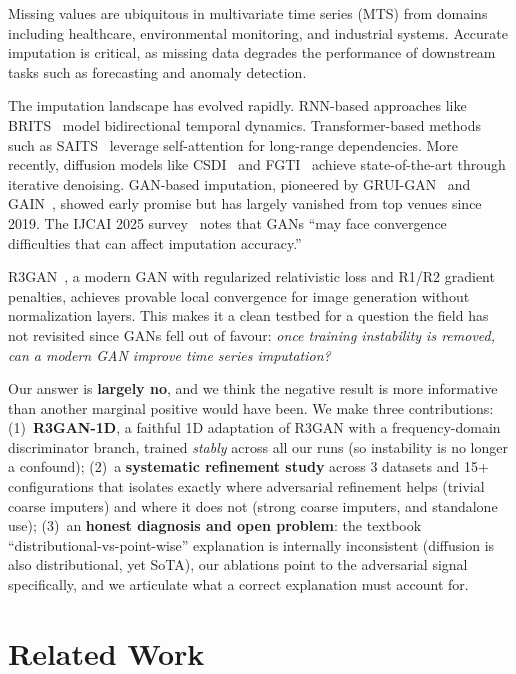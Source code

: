 \documentclass[sigconf,nonacm]{acmart}
\begin{document}
Missing values are ubiquitous in multivariate time series (MTS) from domains including healthcare, environmental monitoring, and industrial systems.
Accurate imputation is critical, as missing data degrades the performance of downstream tasks such as forecasting and anomaly detection.

The imputation landscape has evolved rapidly.
RNN-based approaches like BRITS~\citep{cao2018brits} model bidirectional temporal dynamics.
Transformer-based methods such as SAITS~\citep{du2023saits} leverage self-attention for long-range dependencies.
More recently, diffusion models like CSDI~\citep{tashiro2021csdi} and FGTI~\citep{wang2024fgti} achieve state-of-the-art through iterative denoising.
GAN-based imputation, pioneered by GRUI-GAN~\citep{luo2018grui} and GAIN~\citep{yoon2018gain}, showed early promise but has largely vanished from top venues since 2019. The IJCAI 2025 survey~\citep{wang2025survey} notes that GANs ``may face convergence difficulties that can affect imputation accuracy.''

R3GAN~\citep{huang2024r3gan}, a modern GAN with regularized relativistic loss and R1/R2 gradient penalties, achieves provable local convergence for image generation without normalization layers. This makes it a clean testbed for a question the field has not revisited since GANs fell out of favour: \textit{once training instability is removed, can a modern GAN improve time series imputation?}

Our answer is \textbf{largely no}, and we think the negative result is more informative than another marginal positive would have been. We make three contributions:
(1)~\textbf{R3GAN-1D}, a faithful 1D adaptation of R3GAN with a frequency-domain discriminator branch, trained \emph{stably} across all our runs (so instability is no longer a confound);
(2)~a \textbf{systematic refinement study} across 3 datasets and 15+ configurations that isolates exactly where adversarial refinement helps (trivial coarse imputers) and where it does not (strong coarse imputers, and standalone use);
(3)~an \textbf{honest diagnosis and open problem}: the textbook ``distributional-vs-point-wise'' explanation is internally inconsistent (diffusion is also distributional, yet SoTA), our ablations point to the adversarial signal specifically, and we articulate what a correct explanation must account for.

\section{Related Work}
\end{document}
